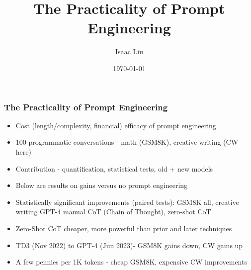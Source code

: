 \documentclass{beamer}
\title[The Practicality of Prompt Engineering]{The Practicality of Prompt Engineering}
\author{Isaac Liu}
\date{\today}
\begin{document}
    \begin{frame}
        \frametitle{The Practicality of Prompt Engineering}
        \begin{itemize}
            \scriptsize
            \item Cost (length/complexity, financial) efficacy of prompt engineering
            \item 100 programmatic conversations - math (GSM8K), creative writing (CW here)
            \item Contribution - quantification, statistical tests, old + new models
            \item Below are results on gains versus no prompt engineering
            \item Statistically significant improvements (paired tests): GSM8K all, creative writing GPT-4 manual CoT (Chain of Thought), zero-shot CoT
            \item Zero-Shot CoT cheaper, more powerful than prior and later techniques
            \item TD3 (Nov 2022) to GPT-4 (Jun 2023)- GSM8K gains down, CW gains up
            \item A few pennies per 1K tokens - cheap GSM8K, expensive CW improvements
        \end{itemize}
        \begin{minipage}{1.1\textwidth}
            \begin{figure}[h]
                \begin{subfigure}[h]{0.4925\textwidth}
                    \centering

\end{subfigure}
\end{figure}
\end{minipage}
\end{frame}
\end{document}
